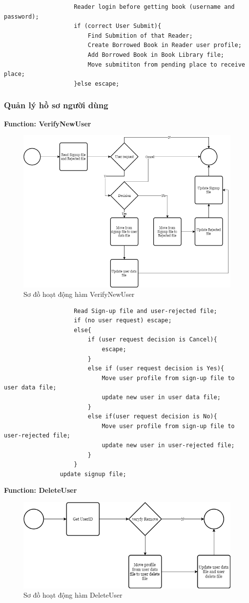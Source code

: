 \documentclass[12pt,a4paper]{report}
\begin{document}
				\begin{verbatim}
					Reader login before getting book (username and password);
					if (correct User Submit){
						Find Submition of that Reader;
						Create Borrowed Book in Reader user profile;
						Add Borrowed Book in Book Library file;
						Move submititon from pending place to receive place;
					}else escape;
				\end{verbatim}
			\subsubsection{Quản lý hồ sơ người dùng}
				\textbf{Function: VerifyNewUser}
				\begin{figure}[H]
					\centering
					\label{F:adduser}
					\includegraphics[scale = .4]{adduser.png}
					\caption{Sơ đồ hoạt động hàm VerifyNewUser}
				\end{figure}
				\begin{verbatim}
					Read Sign-up file and user-rejected file;
					if (no user request) escape;
					else{
						if (user request decision is Cancel){
							escape;
						}
						else if (user request decision is Yes){
							Move user profile from sign-up file to user data file;
							update new user in user data file;
						}
						else if(user request decision is No){
							Move user profile from sign-up file to user-rejected file;
							update new user in user-rejected file;
						}
					}
				update signup file;
				\end{verbatim}
				\textbf{Function: DeleteUser}
				\begin{figure}[H]
					\centering
					\label{F:deleteuser}
					\includegraphics[scale = .4]{deleteuser.png}
					\caption{Sơ đồ hoạt động hàm DeleteUser}
				\end{figure}
\end{document}
